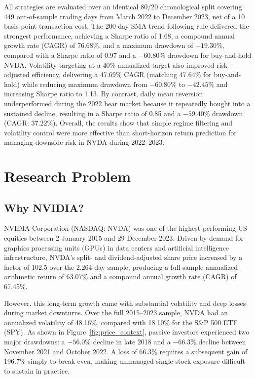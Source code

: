 \documentclass[11pt, a4paper]{article}
\begin{document}
All strategies are evaluated over an identical 80/20 chronological split covering 449 out-of-sample trading days from March 2022 to December 2023, net of a 10 basis point transaction cost. The 200-day SMA trend-following rule delivered the strongest performance, achieving a Sharpe ratio of 1.68, a compound annual growth rate (CAGR) of 76.68\%, and a maximum drawdown of $-19.30\%$, compared with a Sharpe ratio of 0.97 and a $-60.80\%$ drawdown for buy-and-hold NVDA. Volatility targeting at a 40\% annualized target also improved risk-adjusted efficiency, delivering a 47.69\% CAGR (matching 47.64\% for buy-and-hold) while reducing maximum drawdown from $-60.80\%$ to $-42.45\%$ and increasing Sharpe ratio to 1.13. By contrast, daily mean reversion underperformed during the 2022 bear market because it repeatedly bought into a sustained decline, resulting in a Sharpe ratio of 0.85 and a $-59.40\%$ drawdown (CAGR: 37.22\%). Overall, the results show that simple regime filtering and volatility control were more effective than short-horizon return prediction for managing downside risk in NVDA during 2022--2023.

\section{Research Problem}

\subsection{Why NVIDIA?}
NVIDIA Corporation (NASDAQ: NVDA) was one of the highest-performing US equities between 2 January 2015 and 29 December 2023. Driven by demand for graphics processing units (GPUs) in data centers and artificial intelligence infrastructure, NVDA's split- and dividend-adjusted share price increased by a factor of 102.5 over the 2,264-day sample, producing a full-sample annualized arithmetic return of 63.07\% and a compound annual growth rate (CAGR) of 67.45\%.

However, this long-term growth came with substantial volatility and deep losses during market downturns. Over the full 2015--2023 sample, NVDA had an annualized volatility of 48.16\%, compared with 18.10\% for the S\&P 500 ETF (SPY). As shown in Figure~\ref{fig:price_context}, passive investors experienced two major drawdowns: a $-56.0\%$ decline in late 2018 and a $-66.3\%$ decline between November 2021 and October 2022. A loss of 66.3\% requires a subsequent gain of 196.7\% simply to break even, making unmanaged single-stock exposure difficult to sustain in practice.
\end{document}
